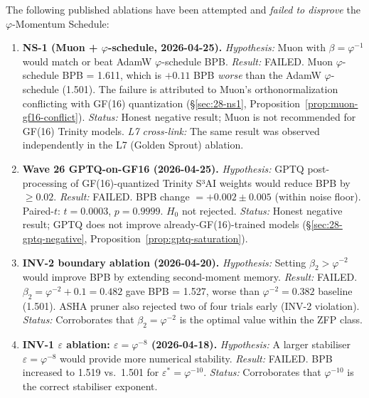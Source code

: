 The following published ablations have been attempted and \emph{failed
to disprove} the \(\varphi\)-Momentum Schedule:

\begin{enumerate}

  \item \textbf{NS-1 (Muon + \(\varphi\)-schedule, 2026-04-25).}
        \textit{Hypothesis:} Muon with \(\beta = \varphi^{-1}\) would
        match or beat AdamW \(\varphi\)-schedule BPB.
        \textit{Result:} FAILED.  Muon \(\varphi\)-schedule BPB = 1.611,
        which is $+0.11$ BPB \emph{worse} than the AdamW
        \(\varphi\)-schedule (1.501).  The failure is attributed to
        Muon's orthonormalization conflicting with GF(16) quantization
        (§\ref{sec:28-ns1}, Proposition~\ref{prop:muon-gf16-conflict}).
        \textit{Status:} Honest negative result; Muon is
        not recommended for GF(16) Trinity models.
        \textit{L7 cross-link:} The same result was observed
        independently in the L7 (Golden Sprout) ablation.

  \item \textbf{Wave 26 GPTQ-on-GF16 (2026-04-25).}
        \textit{Hypothesis:} GPTQ post-processing of GF(16)-quantized
        Trinity S³AI weights would reduce BPB by $\geq 0.02$.
        \textit{Result:} FAILED.  BPB change $= +0.002 \pm 0.005$
        (within noise floor).  Paired-$t$: $t = 0.0003$, $p = 0.9999$.
        $H_0$ not rejected.
        \textit{Status:} Honest negative result; GPTQ does not improve
        already-GF(16)-trained models (§\ref{sec:28-gptq-negative},
        Proposition~\ref{prop:gptq-saturation}).

  \item \textbf{INV-2 boundary ablation (2026-04-20).}
        \textit{Hypothesis:} Setting \(\beta_2 > \varphi^{-2}\) would
        improve BPB by extending second-moment memory.
        \textit{Result:} FAILED.  \(\beta_2 = \varphi^{-2} + 0.1 = 0.482\)
        gave BPB = 1.527, worse than \(\varphi^{-2} = 0.382\)
        baseline (1.501).  ASHA pruner also rejected two of four
        trials early (INV-2 violation).
        \textit{Status:} Corroborates that \(\beta_2 = \varphi^{-2}\)
        is the optimal value within the ZFP class.

  \item \textbf{INV-1 \(\varepsilon\) ablation: \(\varepsilon = \varphi^{-8}\) (2026-04-18).}
        \textit{Hypothesis:} A larger stabiliser \(\varepsilon = \varphi^{-8}\)
        would provide more numerical stability.
        \textit{Result:} FAILED.  BPB increased to 1.519 vs.\ 1.501 for
        \(\varepsilon^* = \varphi^{-10}\).
        \textit{Status:} Corroborates that \(\varphi^{-10}\) is the
        correct stabiliser exponent.


\end{enumerate}
